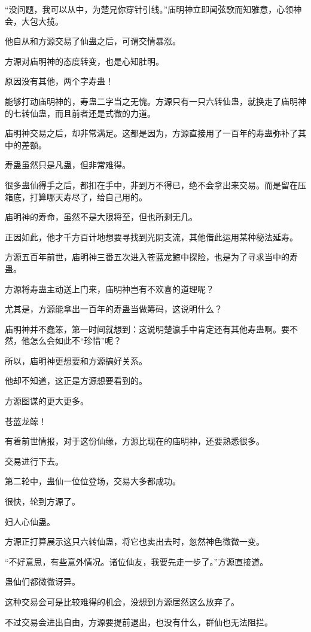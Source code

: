 \begin{this_body}
“没问题，我可以从中，为楚兄你穿针引线。”庙明神立即闻弦歌而知雅意，心领神会，大包大揽。

他自从和方源交易了仙蛊之后，可谓交情暴涨。

方源对庙明神的态度转变，也是心知肚明。

原因没有其他，两个字寿蛊！

能够打动庙明神的，寿蛊二字当之无愧。方源只有一只六转仙蛊，就换走了庙明神的七转仙蛊，而且前者还是式微的力道。

庙明神交易之后，却非常满足。这都是因为，方源直接用了一百年的寿蛊弥补了其中的差额。

寿蛊虽然只是凡蛊，但非常难得。

很多蛊仙得手之后，都扣在手中，非到万不得已，绝不会拿出来交易。而是留在压箱底，打算哪天寿尽了，给自己用的。

庙明神的寿命，虽然不是大限将至，但也所剩无几。

正因如此，他才千方百计地想要寻找到光阴支流，其他借此运用某种秘法延寿。

方源五百年前世，庙明神三番五次进入苍蓝龙鲸中探险，也是为了寻求当中的寿蛊。

方源将寿蛊主动送上门来，庙明神岂有不欢喜的道理呢？

尤其是，方源能拿出一百年的寿蛊当做筹码，这说明什么？

庙明神并不蠢笨，第一时间就想到：这说明楚瀛手中肯定还有其他寿蛊啊。要不然，他怎么会如此不“珍惜”呢？

所以，庙明神更想要和方源搞好关系。

他却不知道，这正是方源想要看到的。

方源图谋的更大更多。

苍蓝龙鲸！

有着前世情报，对于这份仙缘，方源比现在的庙明神，还要熟悉很多。

交易进行下去。

第二轮中，蛊仙一位位登场，交易大多都成功。

很快，轮到方源了。

妇人心仙蛊。

方源正打算展示这只六转仙蛊，将它也卖出去时，忽然神色微微一变。

“不好意思，有些意外情况。诸位仙友，我要先走一步了。”方源直接道。

蛊仙们都微微讶异。

这种交易会可是比较难得的机会，没想到方源居然这么放弃了。

不过交易会进出自由，方源要提前退出，也没有什么，群仙也无法阻拦。


\end{this_body}
